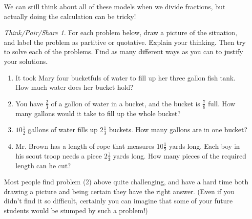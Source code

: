 \documentclass[10pt, reqno]{amsart}
\theoremstyle{remark}
\newtheorem*{thinkpair*}{Think/Pair/Share}
\theoremstyle{definition}
\numberwithin{equation}{section}  %
\begin{document}
We can still think about all of these models when we divide fractions, but actually doing the calculation can be tricky!

\begin{thinkpair*}\label{partorquot}
For each problem below, draw a picture of the situation, and  label the problem as partitive or quotative.  Explain your thinking.  Then try to solve each of the problems.  Find as many different ways as you can to justify your solutions.


\begin{enumerate}
\item
It took Mary four bucketfuls of water to fill up her three gallon fish tank.  How much water does her bucket hold?\\

\item
You have $\frac 2 3$ of a gallon of water in a bucket, and the bucket is $\frac 7 8$ full.  How many gallons would it take to fill up the whole bucket?\\


\item 
$10\frac 1 2$ gallons of water fills up $2 \frac 1 3$ buckets.  How many gallons are in one bucket?\\

\item
Mr. Brown has a length of rope that measures $10 \frac 1 2$ yards long.  Each boy in his scout troop needs a piece $2 \frac 1 3$ yards long.  How many pieces of the required length can he cut?\\


\end{enumerate}



\end{thinkpair*}




Most people find problem (2) above quite challenging, and have a hard time both drawing a picture and being certain they have the right answer.  (Even if you didn't find it so difficult, certainly you can imagine that some of your future students would be stumped by such a problem!)  
\end{document}
